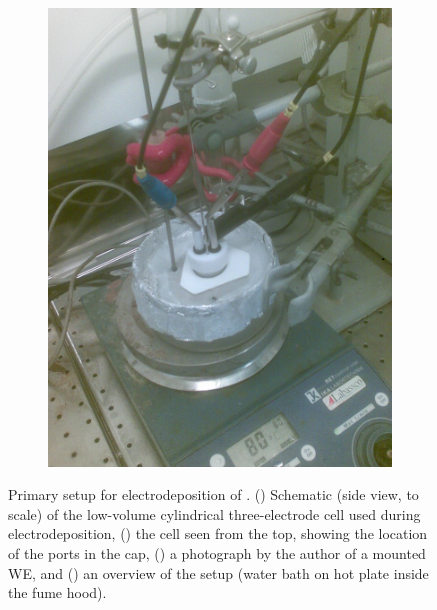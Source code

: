 \documentclass[webedition,openright,titles,swedish,english]{LuaUUThesis}\usepackage[]{graphicx}\usepackage[]{xcolor}
\begin{document}
\begin{figure}[tbp]
{\begin{subfigure}[c]{0.33\linewidth}
    \includegraphics[width=\linewidth,trim={1cm 0cm 1cm 0cm},clip]{synthesis/electrodeposition/0909014.jpg}
    \caption{}
    \label{fig:0201-ED-CHI}
\end{subfigure}%
}%
\caption[Primary electrodeposition setup]{%
  Primary setup for electrodeposition of \zincox.
  ()
  Schematic (side view, to scale) of the low-volume cylindrical three-electrode cell
  used during electrodeposition,
  ()
  the cell seen from the top, showing the location of the ports in the cap,
  ()
  a photograph by the author of a mounted \gls{WE}, and
  ()
  an overview of the setup (water bath on hot plate inside the fume hood).
}
\label{fig:0201-electrodeposition-schematic}
\end{figure}
\end{document}
